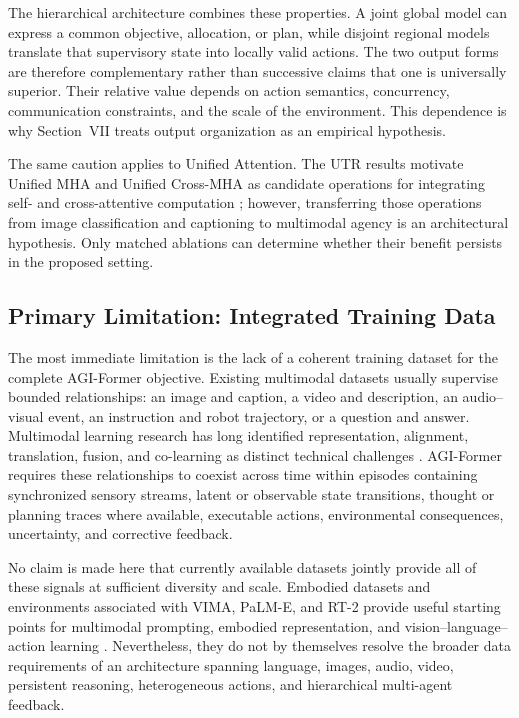The hierarchical architecture combines these properties. A joint global model can express a common objective, allocation, or plan, while disjoint regional models translate that supervisory state into locally valid actions. The two output forms are therefore complementary rather than successive claims that one is universally superior. Their relative value depends on action semantics, concurrency, communication constraints, and the scale of the environment. This dependence is why Section~VII treats output organization as an empirical hypothesis.

The same caution applies to Unified Attention. The UTR results motivate Unified MHA and Unified Cross-MHA as candidate operations for integrating self- and cross-attentive computation \cite{zohourian2026utr}; however, transferring those operations from image classification and captioning to multimodal agency is an architectural hypothesis. Only matched ablations can determine whether their benefit persists in the proposed setting.

\subsection{\textbf{Primary Limitation: Integrated Training Data}}

The most immediate limitation is the lack of a coherent training dataset for the complete AGI-Former objective. Existing multimodal datasets usually supervise bounded relationships: an image and caption, a video and description, an audio--visual event, an instruction and robot trajectory, or a question and answer. Multimodal learning research has long identified representation, alignment, translation, fusion, and co-learning as distinct technical challenges \cite{baltrusaitis2019multimodal}. AGI-Former requires these relationships to coexist across time within episodes containing synchronized sensory streams, latent or observable state transitions, thought or planning traces where available, executable actions, environmental consequences, uncertainty, and corrective feedback.

No claim is made here that currently available datasets jointly provide all of these signals at sufficient diversity and scale. Embodied datasets and environments associated with VIMA, PaLM-E, and RT-2 provide useful starting points for multimodal prompting, embodied representation, and vision--language--action learning \cite{jiang2023vima,driess2023palme,zitkovich2023rt2}. Nevertheless, they do not by themselves resolve the broader data requirements of an architecture spanning language, images, audio, video, persistent reasoning, heterogeneous actions, and hierarchical multi-agent feedback.

